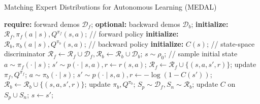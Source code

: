 \documentclass[nohyperref]{article}
\theoremstyle{plain}
\theoremstyle{definition}
\theoremstyle{remark}
\begin{document}
\begin{algorithm}
    \caption{Matching Expert Distributions for Autonomous Learning (MEDAL)}\label{alg:main}
    \begin{algorithmic}
        \STATE \textbf{require:} forward demos $\mathcal{D}_f$;
        \STATE \textbf{optional:}  backward demos $\mathcal{D}_b$;
        \STATE \textbf{initialize:} $\mathcal{R}_f, \pi_f(a \mid s), Q^{\pi_f}(s, a)$; {\color{olive}// forward policy}
        \STATE \textbf{initialize:} $\mathcal{R}_b, \pi_b(a \mid s), Q^{\pi_b}(s, a)$; {\color{olive}// backward policy}
        \STATE \textbf{initialize:} $C(s)$; {\color{olive}// state-space discriminator}
        \STATE $\mathcal{R}_f \gets \mathcal{R}_f \cup \mathcal{D}_f, \mathcal{R}_b \gets \mathcal{R}_b \cup \mathcal{D}_b$;
        \STATE $s \sim \rho_0$; {\color{olive} // sample initial state}
                \STATE $a \sim \pi_f( \cdot \mid s)$;
                \STATE $s' \sim p(\cdot \mid s, a), r \leftarrow r(s, a)$;
                \STATE $\mathcal{R}_f \gets \mathcal{R}_f \cup \{(s, a, s', r)\}$;
                \STATE update $\pi_f, Q^{\pi_f}$;
            \ELSE
                \STATE $a \sim \pi_b( \cdot \mid s)$;
                \STATE $s' \sim p(\cdot \mid s, a), r \leftarrow -\log (1 - C(s'))$;
                \STATE $\mathcal{R}_b \gets \mathcal{R}_b \cup \{(s, a, s', r)\}$;
                \STATE update $\pi_b, Q^{\pi_b}$;
            \ENDIF
                \STATE $S_p \sim \mathcal{D}_f, S_n \sim \mathcal{R}_b$;
                \STATE update $C$ on $S_p \cup S_n$;
            \ENDIF
            \STATE $s \gets s'$;
        \ENDWHILE
    \end{algorithmic}
\end{algorithm}
\end{document}
